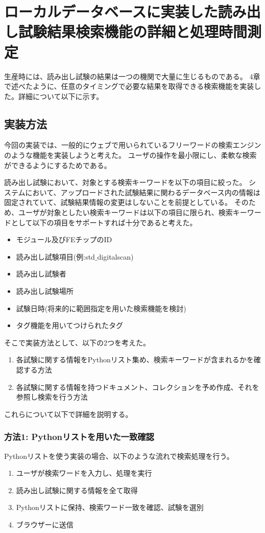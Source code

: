 \chapter{ローカルデータベースに実装した読み出し試験結果検索機能の詳細と処理時間測定}

生産時には、読み出し試験の結果は一つの機関で大量に生じるものである。
4章で述べたように、任意のタイミングで必要な結果を取得できる検索機能を実装した。詳細について以下に示す。


\section{実装方法}
今回の実装では、一般的にウェブで用いられているフリーワードの検索エンジンのような機能を実装しようと考えた。
ユーザの操作を最小限にし、柔軟な検索ができるようにするためである。

読み出し試験において、対象とする検索キーワードを以下の項目に絞った。
システムにおいて、アップロードされた試験結果に関わるデータベース内の情報は固定されていて、試験結果情報の変更はしないことを前提としている。
そのため、ユーザが対象としたい検索キーワードは以下の項目に限られ、検索キーワードとして以下の項目をサポートすれば十分であると考えた。

\begin{itemize}
  \item モジュール及びFEチップのID
  \item 読み出し試験項目(例:std$\_$digitalscan)
  \item 読み出し試験者
  \item 読み出し試験場所
  \item 試験日時(将来的に範囲指定を用いた検索機能を検討)
  \item タグ機能を用いてつけられたタグ
\end{itemize}

そこで実装方法として、以下の2つを考えた。

\begin{enumerate}
  \item 各試験に関する情報をPythonリスト集め、検索キーワードが含まれるかを確認する方法
  \item 各試験に関する情報を持つドキュメント、コレクションを予め作成、それを参照し検索を行う方法
\end{enumerate}

これらについて以下で詳細を説明する。

\subsection{方法1: Pythonリストを用いた一致確認}
Pythonリストを使う実装の場合、以下のような流れで検索処理を行う。
\begin{enumerate}
  \item ユーザが検索ワードを入力し、処理を実行
  \item 読み出し試験に関する情報を全て取得
  \item Pythonリストに保持、検索ワード一致を確認、試験を選別
  \item ブラウザーに送信
\end{enumerate}

